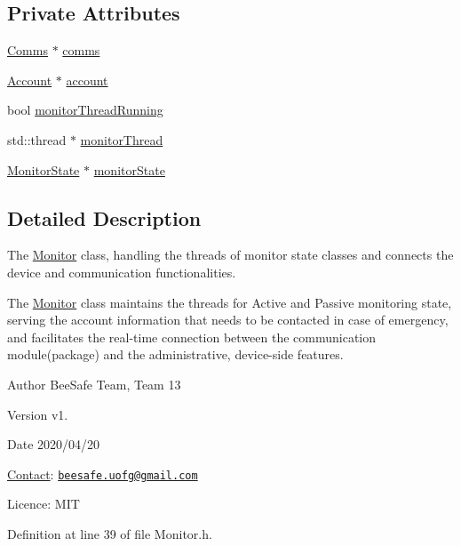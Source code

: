 \subsection*{Private Attributes}
\begin{DoxyCompactItemize}
\item 
\hyperlink{class_comms}{Comms} $\ast$ \hyperlink{class_monitor_a42fffadeba33ae6080b1d95783ca703b}{comms}
\item 
\hyperlink{class_account}{Account} $\ast$ \hyperlink{class_monitor_acacff99178fbcd9eae50801acc346bf4}{account}
\item 
bool \hyperlink{class_monitor_a63d26dffb146b9cfd0705163f3dc4745}{monitor\+Thread\+Running}
\item 
std\+::thread $\ast$ \hyperlink{class_monitor_a1e6bfb7c47a223d8bdc537e2cff07822}{monitor\+Thread}
\item 
\hyperlink{class_monitor_state}{Monitor\+State} $\ast$ \hyperlink{class_monitor_a56b40e06ac7f2f36520e82ee01a17d4c}{monitor\+State}
\end{DoxyCompactItemize}


\subsection{Detailed Description}
The \hyperlink{class_monitor}{Monitor} class, handling the threads of monitor state classes and connects the device and communication functionalities. 

The \hyperlink{class_monitor}{Monitor} class maintains the threads for Active and Passive monitoring state, serving the account information that needs to be contacted in case of emergency, and facilitates the real-\/time connection between the communication module(package) and the administrative, device-\/side features.

\begin{DoxyAuthor}{Author}
Bee\+Safe Team, Team 13
\end{DoxyAuthor}
\begin{DoxyVersion}{Version}
v1.
\end{DoxyVersion}
\begin{DoxyDate}{Date}
2020/04/20
\end{DoxyDate}
\hyperlink{class_contact}{Contact}\+: \href{mailto:beesafe.uofg@gmail.com}{\tt beesafe.\+uofg@gmail.\+com}

Licence\+: M\+IT 

Definition at line 39 of file Monitor.\+h.



